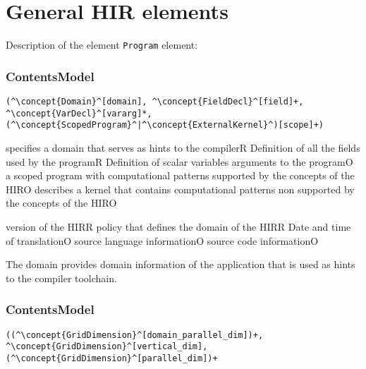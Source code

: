 \section{General HIR elements}


Description of the element {\tt Program} element:

\subsubsection*{ContentsModel}{}

\begin{lstlisting}[style=default]
(^\concept{Domain}^[domain], ^\concept{FieldDecl}^[field]+, ^\concept{VarDecl}^[vararg]*, (^\concept{ScopedProgram}^|^\concept{ExternalKernel}^)[scope]+)
\end{lstlisting}

\begin{HIRChildElements}
{specifies a domain that serves as hints to the compiler}{R}
{Definition of all the fields used by the program}{R}
{Definition of scalar variables arguments to the program}{O}
{a scoped program with computational patterns supported by the concepts of the HIR}{O}
{describes a kernel that contains computational patterns non supported by the concepts of the HIR}{O}
\end{HIRChildElements}

\begin{HIRAttributes}
{version of the HIR}{R}
{policy that defines the domain of the HIR}{R}
{Date and time of translation}{O}
{source language information}{O}
{source code information}{O}
\end{HIRAttributes}


The domain provides domain information of the application that is used as hints to the compiler toolchain.

\subsubsection*{ContentsModel}{}

\begin{lstlisting}[style=default]
((^\concept{GridDimension}^[domain_parallel_dim])+, ^\concept{GridDimension}^[vertical_dim], (^\concept{GridDimension}^[parallel_dim])+
\end{lstlisting}


